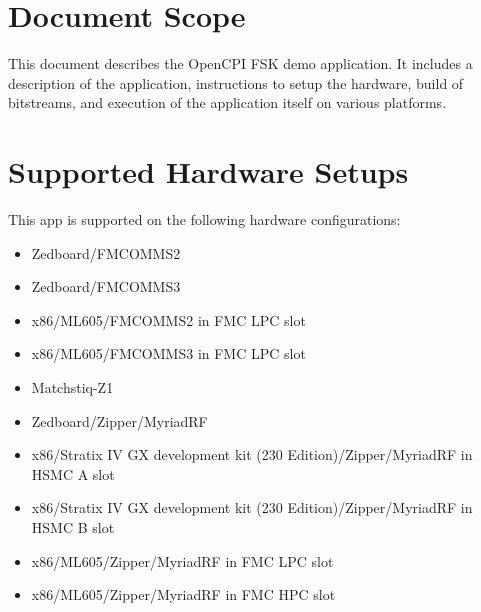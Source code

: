 \newpage
\tableofcontents
\pagebreak
\section{Document Scope}
This document describes the OpenCPI FSK demo application. It includes a description of the application, instructions to setup the hardware, build of bitstreams, and execution of the application itself on various platforms.

\section{Supported Hardware Setups}
This app is supported on the following hardware configurations:
\begin{itemize}
  \item Zedboard/FMCOMMS2
  \item Zedboard/FMCOMMS3
  \item x86/ML605/FMCOMMS2 in FMC LPC slot
  \item x86/ML605/FMCOMMS3 in FMC LPC slot
  \item Matchstiq-Z1
  \item Zedboard/Zipper/MyriadRF
  \item x86/Stratix IV GX development kit (230 Edition)/Zipper/MyriadRF in HSMC A slot
  \item x86/Stratix IV GX development kit (230 Edition)/Zipper/MyriadRF in HSMC B slot
  \item x86/ML605/Zipper/MyriadRF in FMC LPC slot
  \item x86/ML605/Zipper/MyriadRF in FMC HPC slot
\end{itemize}

